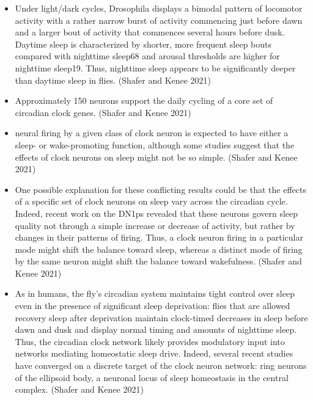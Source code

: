 \documentclass[11pt]{article}
\begin{document}
\begin{itemize}
    \item Under light/dark cycles, Drosophila displays a bimodal pattern of locomotor activity with a rather narrow burst of activity commencing just before dawn and a larger bout of activity that commences several hours before dusk.
    Daytime sleep is characterized by shorter, more frequent sleep bouts compared with nighttime sleep68 and arousal thresholds are higher for nighttime sleep19. Thus, nighttime sleep appears to be significantly deeper than daytime sleep in flies.
    \parencite{shaferRegulationDrosophilaSleep2021} (Shafer and Kenee 2021)

    \item Approximately 150 neurons support the daily cycling of a core set of circadian clock genes.
    \parencite{shaferRegulationDrosophilaSleep2021} (Shafer and Kenee 2021)

    \item neural firing by a given class of clock neuron is expected to have either a sleep- or wake-promoting function, although some studies suggest that the effects of clock neurons on sleep might not be so simple.
    \parencite{shaferRegulationDrosophilaSleep2021} (Shafer and Kenee 2021)

    \item One possible explanation for these conflicting results could be that the effects of a specific set of clock neurons on sleep vary across the circadian cycle.
    Indeed, recent work on the DN1ps revealed that these neurons govern sleep quality not through a simple increase or decrease of activity, but rather by changes in their patterns of firing.
    Thus, a clock neuron firing in a particular mode might shift the balance toward sleep, whereas a distinct mode of firing by the same neuron might shift the balance toward wakefulness.
    \parencite{shaferRegulationDrosophilaSleep2021} (Shafer and Kenee 2021)

    \item As in humans, the fly’s circadian system maintains tight control over sleep even in the presence of significant sleep deprivation: flies that are allowed recovery sleep after deprivation maintain clock-timed decreases in sleep before dawn and dusk and display normal timing and amounts of nighttime sleep.
    Thus, the circadian clock network likely provides modulatory input into networks mediating homeostatic sleep drive. Indeed, several recent studies have converged on a discrete target of the clock neuron network: ring neurons of the ellipsoid body, a neuronal locus of sleep homeostasis in the central complex.
    \parencite{shaferRegulationDrosophilaSleep2021} (Shafer and Kenee 2021)


\end{itemize}
\end{document}
